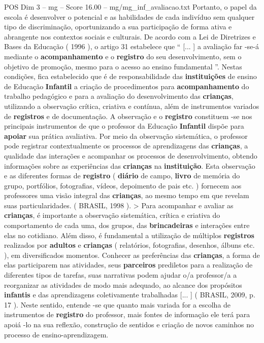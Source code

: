 \begin{textsample}{POS Dim 3 – mg – Score 16.00 – mg/mg\_inf\_avaliacao.txt}
Portanto, o papel da escola é desenvolver o potencial e as habilidades de cada indivíduo sem qualquer tipo de discriminação, oportunizando a sua participação de forma ativa e abrangente nos contextos sociais e culturais.
De acordo com a Lei de Diretrizes e Bases da Educação ( 1996 ), o artigo 31 estabelece que “ [... ] a avaliação far -se-á mediante o \textbf{acompanhamento} e o \textbf{registro} do seu desenvolvimento, sem o objetivo de promoção, mesmo para o acesso ao ensino fundamental ”.
Nestas condições, fica estabelecido que é de responsabilidade das \textbf{instituições} de ensino de Educação \textbf{Infantil} a criação de procedimentos para \textbf{acompanhamento} do trabalho pedagógico e para a avaliação do desenvolvimento das \textbf{crianças}, utilizando a observação crítica, criativa e contínua, além de instrumentos variados de \textbf{registros} e de documentação.
A observação e o \textbf{registro} constituem -se nos principais instrumentos de que o professor da Educação \textbf{Infantil} dispõe para \textbf{apoiar} sua prática avaliativa.
Por meio da observação sistemática, o professor pode registrar contextualmente os processos de aprendizagens das \textbf{crianças}, a qualidade das interações e acompanhar os processos de desenvolvimento, obtendo informações sobre as experiências das \textbf{crianças} na \textbf{instituição}.
Esta observação e as diferentes formas de \textbf{registro} ( \textbf{diário} de campo, \textbf{livro} de memória do grupo, portfólios, fotografias, vídeos, depoimento de pais etc. ) fornecem aos professores uma visão integral das \textbf{crianças}, ao mesmo tempo em que revelam suas particularidades. ( BRASIL, 1998 ). > Para acompanhar e avaliar as \textbf{crianças}, é importante a observação sistemática, crítica e criativa do comportamento de cada uma, dos grupos, das \textbf{brincadeiras} e interações entre elas no cotidiano.
Além disso, é fundamental a utilização de múltiplos \textbf{registros} realizados por \textbf{adultos} e \textbf{crianças} ( relatórios, fotografias, desenhos, álbuns etc. ), em diversificados momentos.
Conhecer as preferências das \textbf{crianças}, a forma de elas participarem nas atividades, seus \textbf{parceiros} prediletos para a realização de diferentes tipos de tarefas, suas narrativas podem ajudar o/a professor/a a reorganizar as atividades de modo mais adequado, ao alcance dos propósitos \textbf{infantis} e das aprendizagens coletivamente trabalhadas [... ] ( BRASIL, 2009, p. 17 ).
Neste sentido, entende -se que quanto mais variada for a escolha de instrumentos de \textbf{registro} do professor, mais fontes de informação ele terá para apoiá -lo na sua reflexão, construção de sentidos e criação de novos caminhos no processo de ensino-aprendizagem.

\end{textsample}
